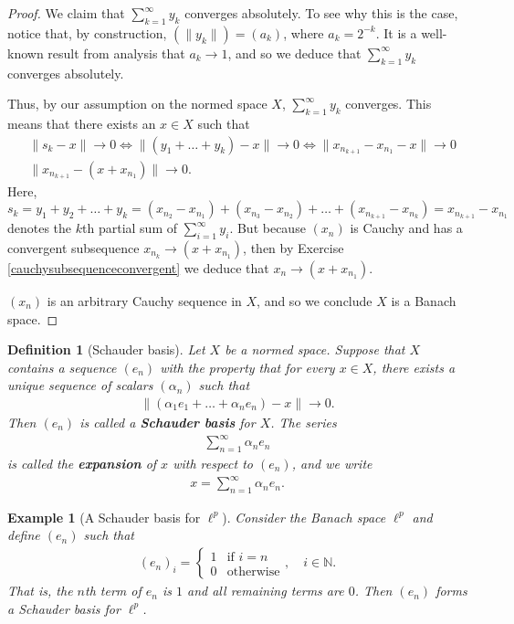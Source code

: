 \documentclass[11pt]{article}
\theoremstyle{mystyle}
\newtheorem{defn}{Definition}[section]
\newtheorem{protoexamp}{Example}[section]
\newenvironment{examp}
{\colorlet{shadecolor}{orange!15}\begin{shaded}\begin{protoexamp}}
{\end{protoexamp}\end{shaded}}
\newcommand{\0}{\mathbf{0}}
\begin{document}
\begin{proof}
We claim that $\sum_{k=1}^{\infty} y_k$ converges absolutely. To see why this is the case, notice that, by construction, $(\|y_k\|) = (a_k)$, where $a_k = 2^{-k}$. It is a well-known result from analysis that $a_k \longrightarrow 1$, and so we deduce that $\sum_{k=1}^{\infty} y_k$ converges absolutely.

Thus, by our assumption on the normed space $X$, $\sum_{k=1}^{\infty} y_k$ converges. This means that there exists an $x \in X$ such that 
\begin{align*}
    &\|s_k - x\| \longrightarrow 0 \iff \|(y_1 + \ldots + y_k) - x\| \longrightarrow 0 \iff \|x_{n_{k+1}} - x_{n_1} - x\| \longrightarrow 0\\
    &\|x_{n_{k+1}} - (x + x_{n_1})\| \longrightarrow 0.
\end{align*}
Here, $s_k = y_1 + y_2 + \ldots + y_k = (x_{n_2} - x_{n_1}) + (x_{n_3} - x_{n_2}) + \ldots + (x_{n_{k+1}} - x_{n_k}) = x_{n_{k+1}}  - x_{n_1}$ denotes the $k$th partial sum of $\sum_{i=1}^{\infty} y_i$. But because $(x_n)$ is Cauchy and has a convergent subsequence $x_{n_k} \longrightarrow (x + x_{n_1})$, then by Exercise \ref{cauchysubsequenceconvergent} we deduce that $x_n \longrightarrow (x + x_{n_1})$. 

$(x_n)$ is an arbitrary Cauchy sequence in $X$, and so we conclude $X$ is a Banach space.
\end{proof}

\begin{defn}[Schauder basis]
Let $X$ be a normed space. Suppose that $X$ contains a sequence $(e_n)$ with the property that for every $x \in X$, there exists a \textit{unique} sequence of scalars $(\alpha_n)$ such that
\begin{align*}
    \|(\alpha_1 e_1 + \ldots + \alpha_n e_n) - x\| \longrightarrow 0.
\end{align*}
Then $(e_n)$ is called a \textbf{Schauder basis} for $X$. The series
\begin{align*}
    \sum_{n=1}^{\infty} \alpha_n e_n
\end{align*}
is called the \textbf{expansion} of $x$ with respect to $(e_n)$, and we write
\begin{align*}
    x = \sum_{n=1}^{\infty}\alpha_n e_n.
\end{align*}
\end{defn}

\begin{examp}[A Schauder basis for $\ell^p$]
Consider the Banach space $\ell^p$ and define $(e_n)$ such that
\begin{align*}
    (e_n)_i = \begin{cases}
    1 & \text{if $i = n$}\\
    0 & \text{otherwise}
    \end{cases}, \quad i \in \mathbb{N}.
\end{align*}
That is, the $n$th term of $e_n$ is $1$ and all remaining terms are $0$. Then $(e_n)$ forms a Schauder basis for $\ell^p$.
\end{examp}
\end{document}
